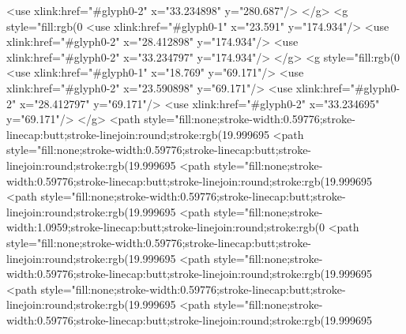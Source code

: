   <use xlink:href="#glyph0-2" x="33.234898" y="280.687"/>
</g>
<g style="fill:rgb(0%
  <use xlink:href="#glyph0-1" x="23.591" y="174.934"/>
  <use xlink:href="#glyph0-2" x="28.412898" y="174.934"/>
  <use xlink:href="#glyph0-2" x="33.234797" y="174.934"/>
</g>
<g style="fill:rgb(0%
  <use xlink:href="#glyph0-1" x="18.769" y="69.171"/>
  <use xlink:href="#glyph0-2" x="23.590898" y="69.171"/>
  <use xlink:href="#glyph0-2" x="28.412797" y="69.171"/>
  <use xlink:href="#glyph0-2" x="33.234695" y="69.171"/>
</g>
<path style="fill:none;stroke-width:0.59776;stroke-linecap:butt;stroke-linejoin:round;stroke:rgb(19.999695%
<path style="fill:none;stroke-width:0.59776;stroke-linecap:butt;stroke-linejoin:round;stroke:rgb(19.999695%
<path style="fill:none;stroke-width:0.59776;stroke-linecap:butt;stroke-linejoin:round;stroke:rgb(19.999695%
<path style="fill:none;stroke-width:0.59776;stroke-linecap:butt;stroke-linejoin:round;stroke:rgb(19.999695%
<path style="fill:none;stroke-width:1.0959;stroke-linecap:butt;stroke-linejoin:round;stroke:rgb(0%
<path style="fill:none;stroke-width:0.59776;stroke-linecap:butt;stroke-linejoin:round;stroke:rgb(19.999695%
<path style="fill:none;stroke-width:0.59776;stroke-linecap:butt;stroke-linejoin:round;stroke:rgb(19.999695%
<path style="fill:none;stroke-width:0.59776;stroke-linecap:butt;stroke-linejoin:round;stroke:rgb(19.999695%
<path style="fill:none;stroke-width:0.59776;stroke-linecap:butt;stroke-linejoin:round;stroke:rgb(19.999695%
